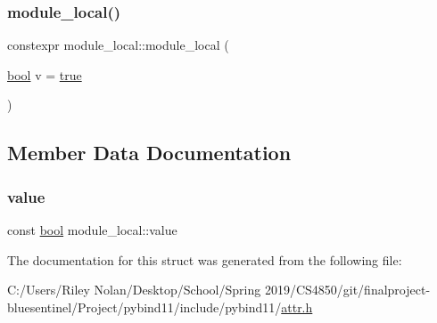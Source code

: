 \subsubsection{\texorpdfstring{module\_local()}{module\_local()}}
{\footnotesize\ttfamily constexpr module\+\_\+local\+::module\+\_\+local (\begin{DoxyParamCaption}\item[{\mbox{\hyperlink{asdl_8h_af6a258d8f3ee5206d682d799316314b1}{bool}}}]{v = {\ttfamily \mbox{\hyperlink{asdl_8h_af6a258d8f3ee5206d682d799316314b1a08f175a5505a10b9ed657defeb050e4b}{true}}} }\end{DoxyParamCaption})\hspace{0.3cm}{\ttfamily [inline]}}



\subsection{Member Data Documentation}
\mbox{\label{structmodule__local_a790e65f3530aa982bc27c82c10ae18d8}} 
\subsubsection{\texorpdfstring{value}{value}}
{\footnotesize\ttfamily const \mbox{\hyperlink{asdl_8h_af6a258d8f3ee5206d682d799316314b1}{bool}} module\+\_\+local\+::value}



The documentation for this struct was generated from the following file\+:\begin{DoxyCompactItemize}
\item 
C\+:/\+Users/\+Riley Nolan/\+Desktop/\+School/\+Spring 2019/\+C\+S4850/git/finalproject-\/bluesentinel/\+Project/pybind11/include/pybind11/\mbox{\hyperlink{attr_8h}{attr.\+h}}\end{DoxyCompactItemize}
